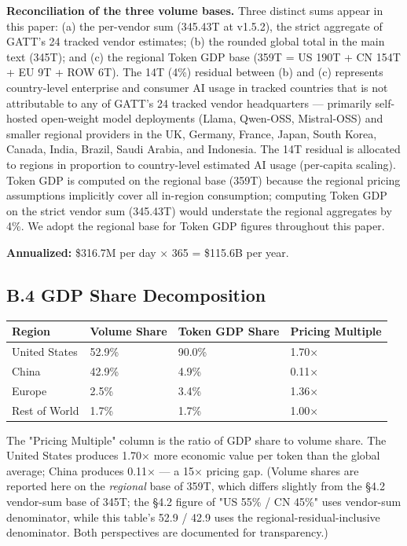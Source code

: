 \documentclass[11pt,a4paper]{article}
\begin{document}
\textbf{Reconciliation of the three volume bases.} Three distinct sums appear in this paper: (a) the per-vendor sum (345.43T at v1.5.2), the strict aggregate of GATT's 24 tracked vendor estimates; (b) the rounded global total in the main text (345T); and (c) the regional Token GDP base (359T = US 190T + CN 154T + EU 9T + ROW 6T). The 14T (4\%) residual between (b) and (c) represents country-level enterprise and consumer AI usage in tracked countries that is not attributable to any of GATT's 24 tracked vendor headquarters --- primarily self-hosted open-weight model deployments (Llama, Qwen-OSS, Mistral-OSS) and smaller regional providers in the UK, Germany, France, Japan, South Korea, Canada, India, Brazil, Saudi Arabia, and Indonesia. The 14T residual is allocated to regions in proportion to country-level estimated AI usage (per-capita scaling). Token GDP is computed on the regional base (359T) because the regional pricing assumptions implicitly cover all in-region consumption; computing Token GDP on the strict vendor sum (345.43T) would understate the regional aggregates by 4\%. We adopt the regional base for Token GDP figures throughout this paper.

\textbf{Annualized:} \$316.7M per day × 365 = \$115.6B per year.

\subsection{B.4 GDP Share Decomposition}

\begin{center}
\begin{tabular}{llll}
\toprule
Region & Volume Share & Token GDP Share & Pricing Multiple \\
\midrule
United States & 52.9\% & 90.0\% & 1.70× \\
China & 42.9\% & 4.9\% & 0.11× \\
Europe & 2.5\% & 3.4\% & 1.36× \\
Rest of World & 1.7\% & 1.7\% & 1.00× \\
\bottomrule
\end{tabular}
\end{center}


The "Pricing Multiple" column is the ratio of GDP share to volume share. The United States produces 1.70× more economic value per token than the global average; China produces 0.11× --- a 15× pricing gap. (Volume shares are reported here on the \emph{regional} base of 359T, which differs slightly from the §4.2 vendor-sum base of 345T; the §4.2 figure of "US 55\% / CN 45\%" uses vendor-sum denominator, while this table's 52.9 / 42.9 uses the regional-residual-inclusive denominator. Both perspectives are documented for transparency.)
\end{document}
